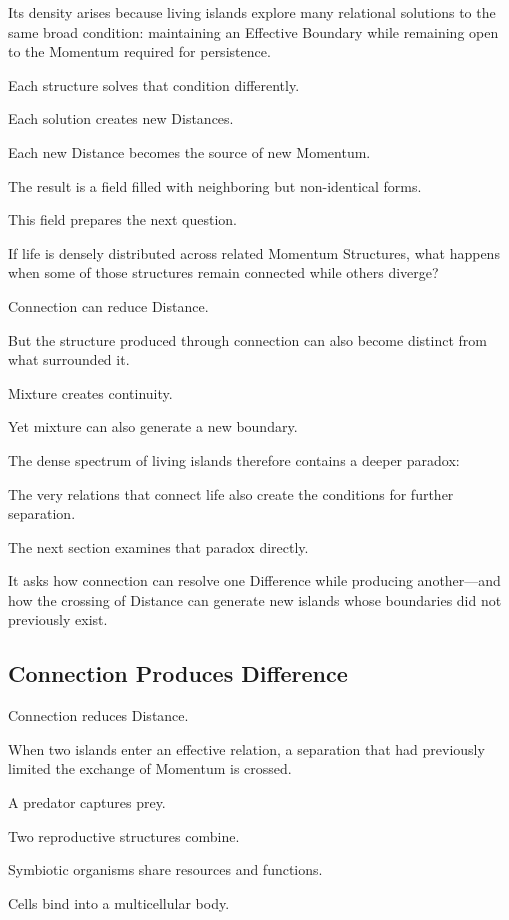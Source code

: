 Its density arises because living islands explore many relational solutions to the same broad condition: maintaining an Effective Boundary while remaining open to the Momentum required for persistence.

Each structure solves that condition differently.

Each solution creates new Distances.

Each new Distance becomes the source of new Momentum.

The result is a field filled with neighboring but non-identical forms.

This field prepares the next question.

If life is densely distributed across related Momentum Structures, what happens when some of those structures remain connected while others diverge?

Connection can reduce Distance.

But the structure produced through connection can also become distinct from what surrounded it.

Mixture creates continuity.

Yet mixture can also generate a new boundary.

The dense spectrum of living islands therefore contains a deeper paradox:

The very relations that connect life also create the conditions for further separation.

The next section examines that paradox directly.

It asks how connection can resolve one Difference while producing another—and how the crossing of Distance can generate new islands whose boundaries did not previously exist.

\subsection*{\textbf{Connection Produces Difference}}

Connection reduces Distance.

When two islands enter an effective relation, a separation that had previously limited the exchange of Momentum is crossed.

A predator captures prey.

Two reproductive structures combine.

Symbiotic organisms share resources and functions.

Cells bind into a multicellular body.

